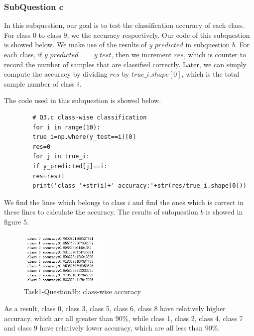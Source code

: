 \documentclass[conference]{IEEEtran}
\begin{document}
	
	
	\subsubsection{SubQuestion c}
	In this subquestion, our goal is to test the classification accuracy of each class. For class $0$ to class $9$, we the accuracy respectively. Our code of this subquestion is showed below. We make use of the results of $y\_predicted$ in subquestion $b$. For each class, if $y\_predicted$ == $y\_test$, then we increment $res$, which is counter to record the number of samples that are classified correctly. Later, we can simply compute the accuracy by dividing $res$ by $true\_i.shape[0]$, which is the total sample number of class $i$.\par
	The code used in this subquestion is showed below.
	\begin{lstlisting}
		# Q3.c class-wise classification
		for i in range(10):
		true_i=np.where(y_test==i)[0]
		res=0
		for j in true_i:
		if y_predicted[j]==i:
		res=res+1
		print('class '+str(i)+' accuracy:'+str(res/true_i.shape[0]))
	\end{lstlisting} \par 
	We find the lines which belongs to class $i$ and find the ones which is correct in these lines to calculate the accuracy. The results of subquestion $b$ is showed in figure $5$.\par
	\begin{figure}[h] 
		\centering
		\includegraphics[width=0.35\textwidth]{T1Q3c.png}
		\caption{Task1-Question3b: class-wise accuracy} 
		\label{Fig.t1q3c} 
	\end{figure}
	
	
	As a result, class 0, class 3, class 5, class 6, class 8 have relatively higher accuracy, which are all greater than $90\%$, while class 1, class 2, class 4, class 7 and class 9 have relatively lower accuracy, which are all less than $90\%$.
	
\end{document}
